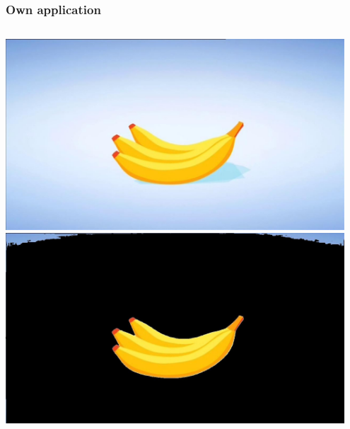 \documentclass{beamer}
\begin{document}
\begin{frame}
    \frametitle{Own application}
    \begin{columns}
            \centering
            \includegraphics[width=0.95\textwidth]{report-images/a_comm_0088.jpg}
            \centering
            \includegraphics[width=0.95\textwidth]{report-images/thresh_a_comm_0088.jpg}
    \end{columns}
\end{frame}
\end{document}

